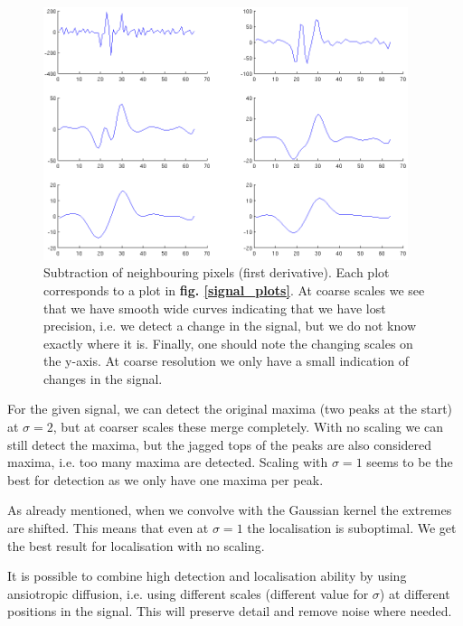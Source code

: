 \documentclass[a4paper, 10pt, final]{article}
\begin{document}
\begin{figure}[!h]
    \centering
    \includegraphics[angle=0,width=0.95\textwidth]{images/scale_zero_cross}
    \caption{Subtraction of neighbouring pixels (first derivative). Each
    plot corresponds to a plot in \textbf{fig. \ref{signal_plots}}.  At
    coarse scales we see that we have smooth wide curves indicating that
    we have lost precision, i.e. we detect a change in the signal, but
    we do not know exactly where it is. Finally, one should note the
    changing scales on the y-axis. At coarse resolution we only have a
    small indication of changes in the signal.}
    \label{edges_plots}
\end{figure}

For the given signal, we can detect the original maxima (two peaks at
the start) at $\sigma = 2$, but at coarser scales these merge
completely. With no scaling we can still detect the maxima, but the
jagged tops of the peaks are also considered maxima, i.e. too many
maxima are detected. Scaling with $\sigma = 1$ seems to be the best for
detection as we only have one maxima per peak.

As already mentioned, when we convolve with the Gaussian kernel the
extremes are shifted. This means that even at $\sigma = 1$ the
localisation is suboptimal. We get the best result for localisation with
no scaling.

It is possible to combine high detection and localisation ability by
using ansiotropic diffusion, i.e. using different scales (different
value for $\sigma$) at different positions in the signal. This will
preserve detail and remove noise where needed.




\end{document}
